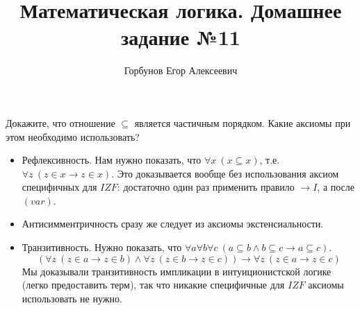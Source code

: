 


\title{Математическая логика. Домашнее задание №11}
\author{Горбунов Егор Алексеевич}


\maketitle

\begin{task}[1]
Докажите, что отношение $\subseteq$ является частичным порядком. Какие
аксиомы при этом необходимо использовать?
\end{task}
\begin{solution}
\begin{itemize}
	\item Рефлексивность. Нам нужно показать, что $\forall x\ (x \subseteq x)$, т.е. $\forall z\ (z \in x \to z \in x)$. Это доказывается вообще без использования аксиом специфичных для $IZF$: достаточно один раз применить правило $\to I$, а после $(var)$.
	\item Антисимментричность сразу же следует из аксиомы экстенсиальности.
	\item Транзитивность. Нужно показать, что $\forall a \forall b \forall c\ (a \subseteq b \land b \subseteq c \to a \subseteq c)$.
	\[
		(\forall z\ (z \in a \to z \in b) \land \forall z\ (z \in b \to z \in c)) \to \forall z\ (z \in a \to z \in c)
	\] 
	Мы доказывали транзитивность импликации в интуиционистской логике (легко предоставить терм), так что никакие специфичные для $IZF$ аксиомы использовать не нужно.
\end{itemize}
\end{solution}

